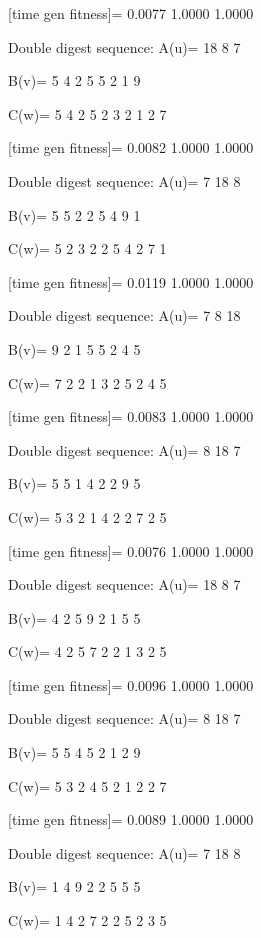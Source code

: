 [time gen fitness]=
    0.0077    1.0000    1.0000

Double digest sequence:
A(u)=
    18     8     7

B(v)=
     5     4     2     5     5     2     1     9

C(w)=
     5     4     2     5     2     3     2     1     2     7

[time gen fitness]=
    0.0082    1.0000    1.0000

Double digest sequence:
A(u)=
     7    18     8

B(v)=
     5     5     2     2     5     4     9     1

C(w)=
     5     2     3     2     2     5     4     2     7     1

[time gen fitness]=
    0.0119    1.0000    1.0000

Double digest sequence:
A(u)=
     7     8    18

B(v)=
     9     2     1     5     5     2     4     5

C(w)=
     7     2     2     1     3     2     5     2     4     5

[time gen fitness]=
    0.0083    1.0000    1.0000

Double digest sequence:
A(u)=
     8    18     7

B(v)=
     5     5     1     4     2     2     9     5

C(w)=
     5     3     2     1     4     2     2     7     2     5

[time gen fitness]=
    0.0076    1.0000    1.0000

Double digest sequence:
A(u)=
    18     8     7

B(v)=
     4     2     5     9     2     1     5     5

C(w)=
     4     2     5     7     2     2     1     3     2     5

[time gen fitness]=
    0.0096    1.0000    1.0000

Double digest sequence:
A(u)=
     8    18     7

B(v)=
     5     5     4     5     2     1     2     9

C(w)=
     5     3     2     4     5     2     1     2     2     7

[time gen fitness]=
    0.0089    1.0000    1.0000

Double digest sequence:
A(u)=
     7    18     8

B(v)=
     1     4     9     2     2     5     5     5

C(w)=
     1     4     2     7     2     2     5     2     3     5

